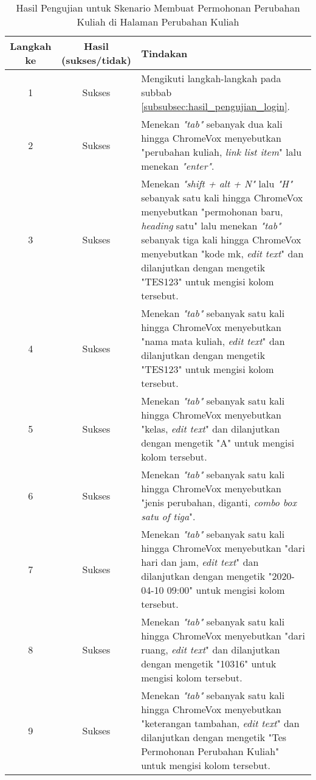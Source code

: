 \begin{table}[H]
    \centering 
    \caption{Hasil Pengujian untuk Skenario Membuat Permohonan Perubahan Kuliah di Halaman Perubahan Kuliah}
    \label{tab:hasil_pengujian_membuat_permohonan_perubahan_kuliah_di_halaman_perubahan_kuliah}
    \begin{tabular}{|c|c|p{10cm}|}
        \toprule
        Langkah ke & Hasil (sukses/tidak) & Tindakan \\

        \midrule
        1 & Sukses & Mengikuti langkah-langkah pada subbab \ref{subsubsec:hasil_pengujian_login}. \\
        2 & Sukses & Menekan \textit{"tab"} sebanyak dua kali hingga ChromeVox menyebutkan "perubahan kuliah, \textit{link list item}" lalu menekan \textit{"enter"}. \\
        3 & Sukses & Menekan \textit{"shift + alt + N"} lalu \textit{"H"} sebanyak satu kali hingga ChromeVox menyebutkan "permohonan baru, \textit{heading} satu" lalu menekan \textit{"tab"} sebanyak tiga kali hingga ChromeVox menyebutkan "kode mk, \textit{edit text}" dan dilanjutkan dengan mengetik "TES123" untuk mengisi kolom tersebut. \\
        4 & Sukses & Menekan \textit{"tab"} sebanyak satu kali hingga ChromeVox menyebutkan "nama mata kuliah, \textit{edit text}" dan dilanjutkan dengan mengetik "TES123" untuk mengisi kolom tersebut. \\
        5 & Sukses & Menekan \textit{"tab"} sebanyak satu kali hingga ChromeVox menyebutkan "kelas, \textit{edit text}" dan dilanjutkan dengan mengetik "A" untuk mengisi kolom tersebut. \\
        6 & Sukses & Menekan \textit{"tab"} sebanyak satu kali hingga ChromeVox menyebutkan "jenis perubahan, diganti, \textit{combo box satu of tiga}". \\
        7 & Sukses & Menekan \textit{"tab"} sebanyak satu kali hingga ChromeVox menyebutkan "dari hari dan jam, \textit{edit text}" dan dilanjutkan dengan mengetik "2020-04-10 09:00" untuk mengisi kolom tersebut. \\
        8 & Sukses & Menekan \textit{"tab"} sebanyak satu kali hingga ChromeVox menyebutkan "dari ruang, \textit{edit text}" dan dilanjutkan dengan mengetik "10316" untuk mengisi kolom tersebut. \\
        9 & Sukses & Menekan \textit{"tab"} sebanyak satu kali hingga ChromeVox menyebutkan "keterangan tambahan, \textit{edit text}" dan dilanjutkan dengan mengetik "Tes Permohonan Perubahan Kuliah" untuk mengisi kolom tersebut. \\

\end{tabular}
\end{table}
